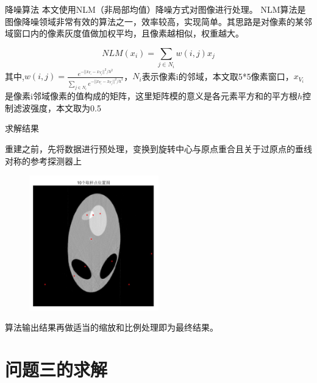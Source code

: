 \documentclass{beamer}
\begin{document}
  
  
\begin{frame}{降噪算法}
	本文使用NLM（非局部均值）降噪方式对图像进行处理。 NLM算法是图像降噪领域非常有效的算法之一，效率较高，实现简单。其思路是对像素的某邻域窗口内的像素灰度值做加权平均，且像素越相似，权重越大。
	  
	\begin{equation}
		NLM(x_{i})=\sum_{j\in N_{i}} w(i,j)x_{j}
	\end{equation}
	其中,\(w(i,j)=\frac{e^{-||x_{V_{i}}-x_{V_{j}}||^2/h^2}}{\sum_{j\in N_{i}}e^{-||x_{V_{i}}-x_{V_{j}}||^2/h^2}}\)，$N_{i}$表示像素i的邻域，本文取5*5像素窗口，$x_{V_{i}}$是像素i邻域像素的值构成的矩阵，这里矩阵模的意义是各元素平方和的平方根$h$控制滤波强度，本文取为0.5
\end{frame}
  
  
  
\begin{frame}{求解结果}
	  
	\small 重建之前，先将数据进行预处理，变换到旋转中心与原点重合且关于过原点的垂线对称的参考探测器上\\
	  
	\begin{figure}[H]
		\centering
		\includegraphics[width=0.5\textwidth]{./pic/DOT.jpg}\\
	\end{figure}
	  
	算法输出结果再做适当的缩放和比例处理即为最终结果。
	  
\end{frame}
  
  
  
\section{问题三的求解}
  
\end{document}
